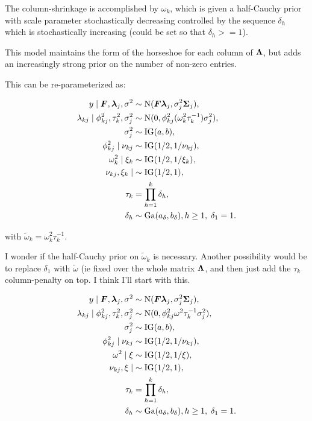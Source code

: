 \documentclass[11pt]{amsart}
\newcommand*{\B}[1]{\ifmmode\bm{#1}\else\textbf{#1}\fi}
\begin{document}
The column-shrinkage is accomplished by $\omega_k$, which is given a half-Cauchy prior with scale parameter stochastically decreasing 
controlled by the sequence ${\delta_h}$ which is stochastically increasing (could be set so that $\delta_h >= 1$). 

This model maintains the form of the horseshoe for each column of $\B{\Lambda}$, but adds an increasingly strong prior on the number of non-zero entries.

This can be re-parameterized as:

\begin{align*}
y \mid \B{F},\B{\lambda}_j,\sigma^2 &\sim \mbox{N}(\B{F}\B{\lambda}_j, \sigma^2_j\B{\Sigma}_j), \\
\lambda_{kj} \mid \phi^2_{kj}, \tau^2_k, \sigma^2_j &\sim \mbox{N}(0,\phi^2_{kj} (\omega^2_k \tau_k^{-1}) \sigma^2_j), \\
\sigma^2_j &\sim \mbox{IG}(a,b), \\
\phi^2_{kj} \mid \nu_{kj} &\sim \mbox{IG}(1/2,1/\nu_{kj}), \\
\omega^2_k \mid \xi_k &\sim \mbox{IG}(1/2,1/\xi_k), \\
\nu_{kj},\xi_k \mid &\sim \mbox{IG}(1/2,1), \\
\tau_k &= \prod\limits_{h=1}^k \delta_h, \\
\delta_h &\sim \mbox{Ga}(a_\delta,b_\delta), h \geq 1, \; \delta_1 = 1.
\end{align*}

\noindent with $\tilde{\omega}_k = \omega^2_k \tau_k^{-1}$. 


I wonder if the half-Cauchy prior on $\tilde{\omega}_k$ is necessary. 
Another possibility would be to replace $\delta_1$ with $\tilde{\omega}$ (ie fixed over the whole matrix $\B{\Lambda}$, and then just add the $\tau_k$ column-penalty
on top. I think I'll start with this.


\begin{align*}
y \mid \B{F},\B{\lambda}_j,\sigma^2 &\sim \mbox{N}(\B{F}\B{\lambda}_j, \sigma^2_j\B{\Sigma}_j), \\
\lambda_{kj} \mid \phi^2_{kj}, \tau^2_k, \sigma^2_j &\sim \mbox{N}(0,\phi^2_{kj} \omega^2 \tau_k^{-1} \sigma^2_j), \\
\sigma^2_j &\sim \mbox{IG}(a,b), \\
\phi^2_{kj} \mid \nu_{kj} &\sim \mbox{IG}(1/2,1/\nu_{kj}), \\
\omega^2 \mid \xi &\sim \mbox{IG}(1/2,1/\xi), \\
\nu_{kj},\xi \mid &\sim \mbox{IG}(1/2,1), \\
\tau_k &= \prod\limits_{h=1}^k \delta_h, \\
\delta_h &\sim \mbox{Ga}(a_\delta,b_\delta), h \geq 1, \; \delta_1 = 1.
\end{align*}
\end{document}
